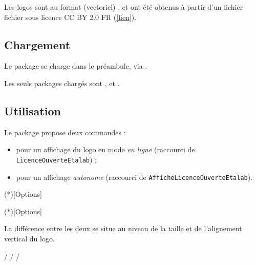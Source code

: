 \documentclass[french,11pt,a4paper]{article}
\begin{document}
\medskip

Les logos sont au format (vectoriel) , et ont été obtenus à partir d'un fichier fichier  sous licence CC BY 2.0 FR (\href{https://fr.m.wikipedia.org/wiki/Fichier:Logo-licence-ouverte2.svg}{[lien]}).

\subsection{Chargement}

Le package se charge dans le préambule, via .

Les seuls packages chargés sont ,  et .


\subsection{Utilisation}

Le package propose deux commandes :

\medskip

\begin{itemize}
	\item {} pour un affichage du logo en mode \textit{en ligne} (raccourci de \texttt{LicenceOuverteEtalab}) ;
	\item {} pour un affichage \textit{autonome} (raccourci de \texttt{AfficheLicenceOuverteEtalab}).
\end{itemize}

\medskip

\begin{codehigh}[language=latex/latex2,style/main=cyan!10,style/code=cyan!10]
\loetalab(*)[Options]

\affloetalab(*)[Options]
\end{codehigh}

La différence entre les deux se situe au niveau de la taille et de l'alignement vertical du logo.

\begin{demohigh}[language=latex/latex3,style/main=cyan!10,style/code=cyan!10,style/demo=cyan!10]
\loetalab{} / \loetalab* / \affloetalab{} / \affloetalab*
\end{demohigh}
\end{document}
